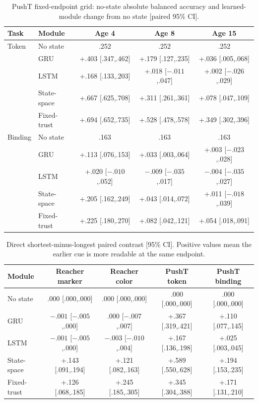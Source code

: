 \begin{table}[H]
\centering
\scriptsize
\setlength{\tabcolsep}{3.0pt}
\renewcommand{\arraystretch}{1.08}
\caption{PushT fixed-endpoint grid: no-state absolute balanced accuracy and learned-module change from no state [paired 95\% CI].}
\begin{tabular}{@{}llccc@{}}
\toprule
Task & Module & Age 4 & Age 8 & Age 15 \\
\midrule
Token & No state & .252 & .252 & .252 \\
 & GRU & +.403 [.347,.462] & +.179 [.127,.235] & +.036 [.005,.068] \\
 & LSTM & +.168 [.133,.203] & +.018 [$-.011$,.047] & +.002 [$-.026$,.029] \\
 & State-space & +.667 [.625,.708] & +.311 [.261,.361] & +.078 [.047,.109] \\
 & Fixed-trust & +.694 [.652,.735] & +.528 [.478,.578] & +.349 [.302,.396] \\
\midrule
Binding & No state & .163 & .163 & .163 \\
 & GRU & +.113 [.076,.153] & +.033 [.003,.064] & +.003 [$-.023$,.028] \\
 & LSTM & +.020 [$-.010$,.052] & $-.009$ [$-.035$,.017] & $-.004$ [$-.035$,.027] \\
 & State-space & +.205 [.162,.249] & +.043 [.014,.072] & +.011 [$-.018$,.039] \\
 & Fixed-trust & +.225 [.180,.270] & +.082 [.042,.121] & +.054 [.018,.091] \\
\bottomrule
\end{tabular}
\end{table}

\begin{table}[H]
\centering
\scriptsize
\setlength{\tabcolsep}{2.7pt}
\renewcommand{\arraystretch}{1.08}
\caption{Direct shortest-minus-longest paired contrast [95\% CI]. Positive values mean the earlier cue is more readable at the same endpoint.}
\begin{tabular}{@{}lcccc@{}}
\toprule
Module & Reacher marker & Reacher color & PushT token & PushT binding \\
\midrule
No state & .000 [.000,.000] & .000 [.000,.000] & .000 [.000,.000] & .000 [.000,.000] \\
GRU & $-.001$ [$-.005$,.000] & .000 [$-.007$,.007] & +.367 [.319,.421] & +.110 [.077,.145] \\
LSTM & $-.001$ [$-.005$,.000] & $-.003$ [$-.010$,.004] & +.167 [.136,.198] & +.025 [.003,.045] \\
State-space & +.143 [.091,.194] & +.121 [.082,.163] & +.589 [.550,.628] & +.194 [.153,.235] \\
Fixed-trust & +.126 [.068,.185] & +.245 [.185,.305] & +.345 [.304,.388] & +.171 [.131,.210] \\
\bottomrule
\end{tabular}
\end{table}

